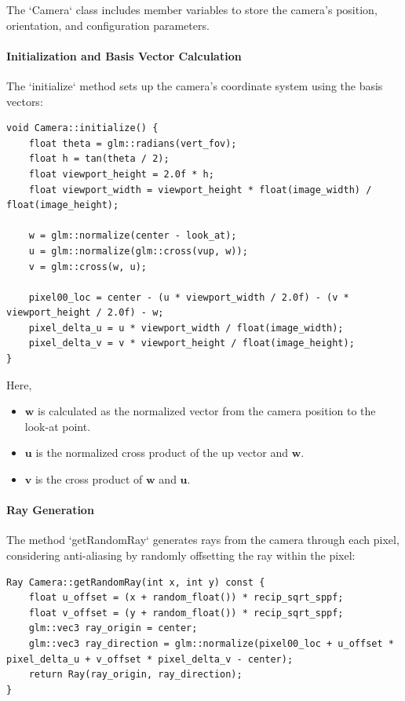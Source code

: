 \documentclass[12pt]{article}
\begin{document}
The `Camera` class includes member variables to store the camera's position, orientation, and configuration parameters.

\paragraph{Initialization and Basis Vector Calculation}
The `initialize` method sets up the camera's coordinate system using the basis vectors:

\begin{verbatim}
void Camera::initialize() {
    float theta = glm::radians(vert_fov);
    float h = tan(theta / 2);
    float viewport_height = 2.0f * h;
    float viewport_width = viewport_height * float(image_width) / float(image_height);

    w = glm::normalize(center - look_at);
    u = glm::normalize(glm::cross(vup, w));
    v = glm::cross(w, u);

    pixel00_loc = center - (u * viewport_width / 2.0f) - (v * viewport_height / 2.0f) - w;
    pixel_delta_u = u * viewport_width / float(image_width);
    pixel_delta_v = v * viewport_height / float(image_height);
}
\end{verbatim}

Here,
\begin{itemize}
    \item \(\mathbf{w}\) is calculated as the normalized vector from the camera position to the look-at point.
    \item \(\mathbf{u}\) is the normalized cross product of the up vector and \(\mathbf{w}\).
    \item \(\mathbf{v}\) is the cross product of \(\mathbf{w}\) and \(\mathbf{u}\).
\end{itemize}

\paragraph{Ray Generation}
The method `getRandomRay` generates rays from the camera through each pixel, considering anti-aliasing by randomly offsetting the ray within the pixel:

\begin{verbatim}
Ray Camera::getRandomRay(int x, int y) const {
    float u_offset = (x + random_float()) * recip_sqrt_sppf;
    float v_offset = (y + random_float()) * recip_sqrt_sppf;
    glm::vec3 ray_origin = center;
    glm::vec3 ray_direction = glm::normalize(pixel00_loc + u_offset * pixel_delta_u + v_offset * pixel_delta_v - center);
    return Ray(ray_origin, ray_direction);
}
\end{verbatim}
\end{document}
